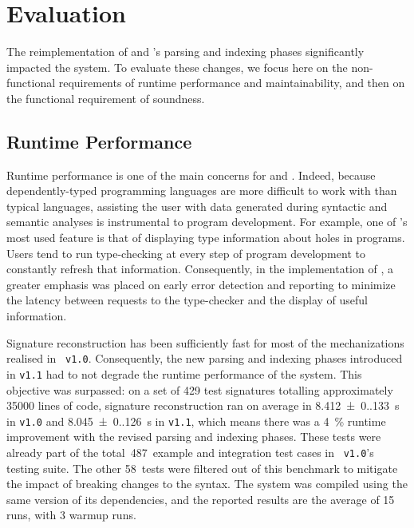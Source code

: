 \section{Evaluation}


The reimplementation of \Beluga and \Harpoon's parsing and indexing phases significantly impacted the system.
To evaluate these changes, we focus here on the non-functional requirements of runtime performance and maintainability, and then on the functional requirement of soundness.

\subsection*{Runtime Performance}


Runtime performance is one of the main concerns for \Beluga and \Harpoon.
Indeed, because dependently-typed programming languages are more difficult to work with than typical languages, assisting the user with data generated during syntactic and semantic analyses is instrumental to program development.
For example, one of \Beluga's most used feature is that of displaying type information about holes in programs.
Users tend to run type-checking at every step of program development to constantly refresh that information.
Consequently, in the implementation of \Beluga, a greater emphasis was placed on early error detection and reporting to minimize the latency between requests to the type-checker and the display of useful information.


Signature reconstruction has been sufficiently fast for most of the mechanizations realised in \Beluga~\texttt{v1.0}.
Consequently, the new parsing and indexing phases introduced in \texttt{v1.1} had to not degrade the runtime performance of the system.
This objective was surpassed: on a set of \num{429} test \Beluga signatures totalling approximately \num{35000} lines of code, signature reconstruction ran on average in \SI{8.412(0.133)}{\second} in \texttt{v1.0} and \SI{8.045(0.126)}{\second} in \texttt{v1.1}, which means there was a \SI{4}{\percent} runtime improvement with the revised parsing and indexing phases.
These tests were already part of the total~\num{487}~example and integration test cases in \Beluga~\texttt{v1.0}'s testing suite.
The other \num{58}~tests were filtered out of this benchmark to mitigate the impact of breaking changes to the syntax.
The system was compiled using the same version of its dependencies, and the reported results are the average of \num{15} runs, with \num{3} warmup runs.

